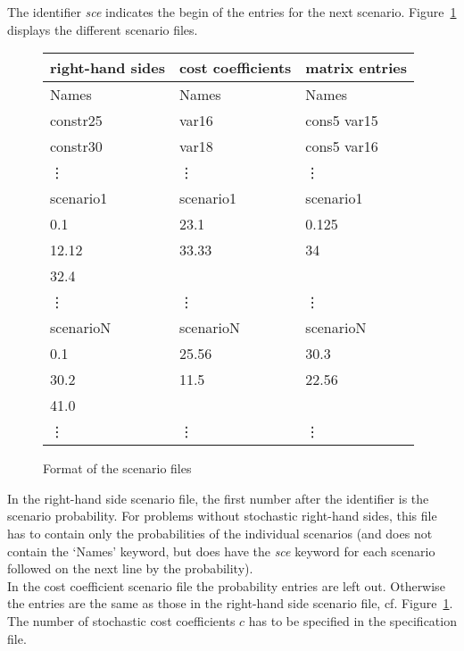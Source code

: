 \documentclass[11pt,draft]{article}
\newcommand{\+}{{\ti{+}}}
\newcommand{\1}{{\ti{1}}}
\begin{document}
The identifier {\it sce} indicates the begin of the entries for the next
scenario. Figure~\ref{F:SCRHS} displays the different scenario files.  
%
\begin{figure}[ht]
\begin{center}
\begin{tabular}{lll}
right-hand sides&cost coefficients& matrix entries \\ \hline
Names\hspace*{3cm}& Names\hspace*{3cm}& Names  \\ 
constr25 & var16 & cons5 var15\\
constr30 & var18 & cons5 var16\\
\vdots   & \vdots   & \vdots \\
scenario1\hspace*{3cm}& scenario1\hspace*{3cm}& scenario1  \\ 
0.1      & 23.1       &	   0.125 \\ 
12.12   & 33.33       &	   34	   \\
32.4     &          &               \\
\vdots   & \vdots   & \vdots \\
scenarioN& scenarioN&scenarioN \\
0.1      & 25.56    &	   30.3 	    \\ 
30.2       & 11.5       &	   22.56  \\
41.0       &          &\\
\vdots   & \vdots   &   \vdots    \\
\end{tabular}
\end{center} \caption{Format of the scenario files} \label{F:SCRHS} 
\end{figure}

In the right-hand side scenario file, the first number after the identifier is the scenario
probability. For problems without stochastic right-hand sides, this file has to contain only the
probabilities of the individual scenarios (and does not contain the `Names' keyword, but does have the {\it sce} 
keyword for each scenario followed on the next line by the probability).\\

In the cost coefficient scenario file the probability entries are left out. Otherwise the entries
are the same as those in the right-hand side scenario file, cf. Figure~\ref{F:SCRHS}.
The number of stochastic cost coefficients $c$ has to be specified in the
specification file. 
\end{document}
